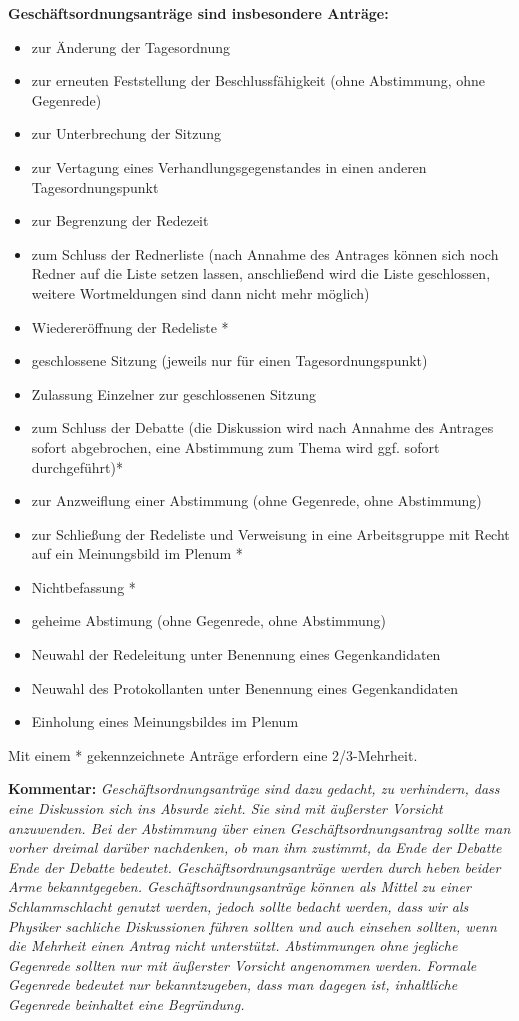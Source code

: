 \documentclass[draft,12pt,oneside]{scrreprt}
\begin{document}
\begin{enumerate}
    \textbf{Geschäftsordnungsanträge sind insbesondere Anträge:}
    \begin{itemize}
      \item zur Änderung der Tagesordnung
      \item zur erneuten Feststellung der Beschlussfähigkeit (ohne Abstimmung, ohne Gegenrede)
      \item zur Unterbrechung der Sitzung
      \item zur Vertagung eines Verhandlungsgegenstandes in einen anderen Tagesordnungspunkt
      \item zur Begrenzung der Redezeit
      \item zum Schluss der Rednerliste (nach Annahme des Antrages können sich noch Redner auf die Liste
            setzen lassen, anschließend wird die Liste geschlossen, weitere Wortmeldungen sind dann nicht
            mehr möglich)
      \item Wiedereröffnung der Redeliste *
      \item geschlossene Sitzung (jeweils nur für einen Tagesordnungspunkt)
      \item Zulassung Einzelner zur geschlossenen Sitzung
      \item zum Schluss der Debatte (die Diskussion wird nach Annahme des Antrages sofort abgebrochen, eine
            Abstimmung zum Thema wird ggf. sofort durchgeführt)*
      \item zur Anzweiflung einer Abstimmung (ohne Gegenrede, ohne Abstimmung)
      \item zur Schließung der Redeliste und Verweisung in eine Arbeitsgruppe mit Recht auf ein Meinungsbild im Plenum *
      \item Nichtbefassung *
      \item geheime Abstimung (ohne Gegenrede, ohne Abstimmung)
      \item Neuwahl der Redeleitung unter Benennung eines Gegenkandidaten
      \item Neuwahl des Protokollanten unter Benennung eines Gegenkandidaten
      \item Einholung eines Meinungsbildes im Plenum
    \end{itemize}
    Mit einem * gekennzeichnete Anträge erfordern eine 2/3-Mehrheit.
\end{enumerate}

\textbf{Kommentar:} \textit{\footnotesize Geschäftsordnungsanträge
sind dazu gedacht, zu verhindern, dass eine Diskussion sich ins
Absurde zieht. Sie sind mit äußerster Vorsicht anzuwenden. Bei der
Abstimmung über einen Geschäftsordnungsantrag sollte man vorher
dreimal darüber nachdenken, ob man ihm zustimmt, da Ende der Debatte
Ende der Debatte bedeutet. Geschäftsordnungsanträge werden durch
heben beider Arme bekanntgegeben. Geschäftsordnungsanträge können
als Mittel zu einer Schlammschlacht genutzt werden, jedoch sollte
bedacht werden, dass wir als Physiker sachliche Diskussionen führen
sollten und auch einsehen sollten, wenn die Mehrheit einen Antrag
nicht unterstützt. Abstimmungen ohne jegliche Gegenrede sollten nur
mit äußerster Vorsicht angenommen werden. Formale Gegenrede bedeutet
nur bekanntzugeben, dass man dagegen ist,
inhaltliche Gegenrede beinhaltet eine Begründung.}
\end{document}
